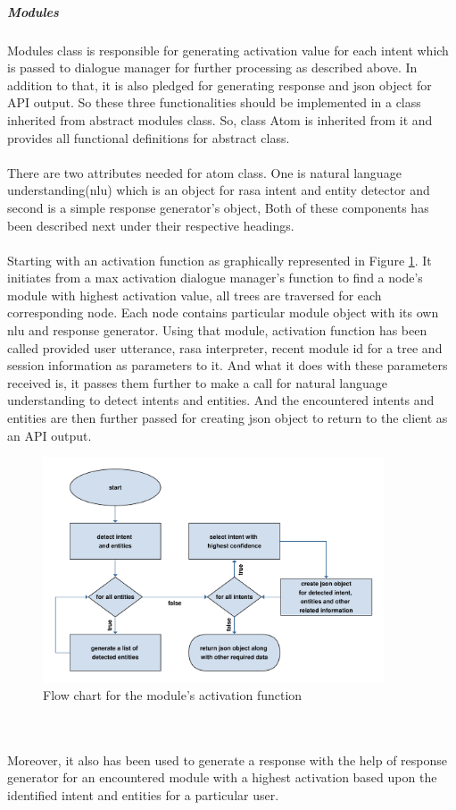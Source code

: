 \subparagraph*{Modules} Modules class is responsible for generating activation value for each intent which is passed to dialogue manager for further processing as described above. In addition to that, it is also pledged for generating response and json object for API output. So these three functionalities should be implemented in a class inherited from abstract modules class. So, class Atom is inherited from it and provides all functional definitions for abstract class. 
\\~\\
There are two attributes needed for atom class. One is natural language understanding(nlu) which is an object for rasa intent and entity detector and second is a simple response generator's object, Both of these components has been described next under their respective headings. 
\\~\\
Starting with an activation function as graphically represented in Figure \ref{fig:flowModule}. It initiates from a max activation dialogue manager's function to find a node's module with highest activation value, all trees are traversed for each corresponding node. Each node contains particular module object with its own nlu and response generator. Using that module, activation function has been called provided user utterance, rasa interpreter, recent module id for a tree and session information as parameters to it. And what it does with these parameters received is, it passes them further to make a call for natural language understanding to detect intents and entities. And the encountered intents and entities are then further passed for creating json object to return to the client as an API output. 

\begin{figure}[!h]
    \centering
    \includegraphics[width=0.9\textwidth]{img/module.pdf}
    \caption{Flow chart for the module's activation function}
    \label{fig:flowModule}
\end{figure}
\\~\\
Moreover, it also has been used to generate a response with the help of response generator for an encountered module with a highest activation based upon the identified intent and entities for a particular user.

